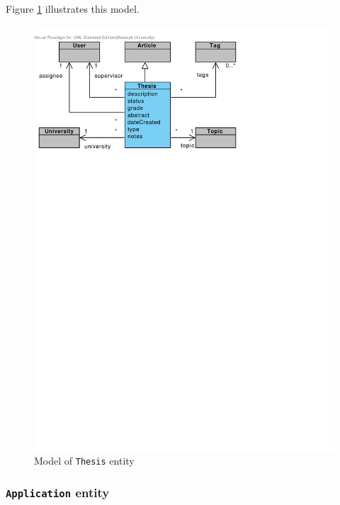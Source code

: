 Figure \ref{fig:domain-thesis-entity} illustrates this model.

\begin{figure}[h]
    \centering
        \includegraphics[trim=0 600 190 30, clip, keepaspectratio, width=\textwidth]{./images/domain-thesis-entity.pdf}
    \caption{Model of \texttt{Thesis} entity}
    \label{fig:domain-thesis-entity}
\end{figure}

\subsubsection{\texttt{Application} entity}


